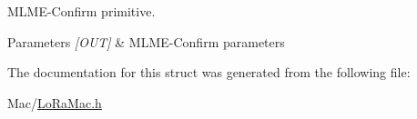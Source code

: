 M\+L\+M\+E-\/\+Confirm primitive. 


\begin{DoxyParams}{Parameters}
{\em \mbox{[}\+O\+U\+T\mbox{]}} & M\+L\+M\+E-\/\+Confirm parameters \\
\hline
\end{DoxyParams}


The documentation for this struct was generated from the following file\+:\begin{DoxyCompactItemize}
\item 
Mac/\hyperlink{LoRaMac_8h}{Lo\+Ra\+Mac.\+h}\end{DoxyCompactItemize}
